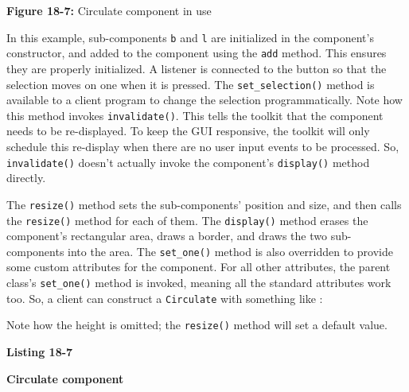 {\sffamily\bfseries Figure 18-7:}
{\sffamily Circulate component in use}

\bigskip

In this example, sub-components \texttt{b} and \texttt{l} are
initialized in the component's constructor, and
added to the component using the \texttt{add} method. This ensures
they are properly initialized. A listener is connected to the button
so that the selection moves on one when it is pressed. The
\texttt{set\_selection()} method is available to a client program to
change the selection programmatically. Note how this method invokes
\texttt{invalidate()}. This tells the toolkit that the component
needs to be re-displayed. To keep the GUI responsive, the toolkit
will only schedule this re-display when there are no user input events
to be processed. So, \texttt{invalidate()} doesn't
actually invoke the component's \texttt{display()}
method directly.

The \texttt{resize()} method sets the sub-components'
position and size, and then calls the \texttt{resize()} method for each
of them. The \texttt{display()} method erases the
component's rectangular area, draws a border, and
draws the two sub-components into the area. The \texttt{set\_one()}
method is also overridden to provide some custom attributes for the
component. For all other attributes, the parent
class's \texttt{set\_one()} method is invoked, meaning
all the standard attributes work too. So, a client can construct a
\texttt{Circulate} with something like :


Note how the height is omitted; the \texttt{resize()} method will set a
default value.

\bigskip

{\sffamily\bfseries Listing 18-7}

{\sffamily\bfseries Circulate component}

